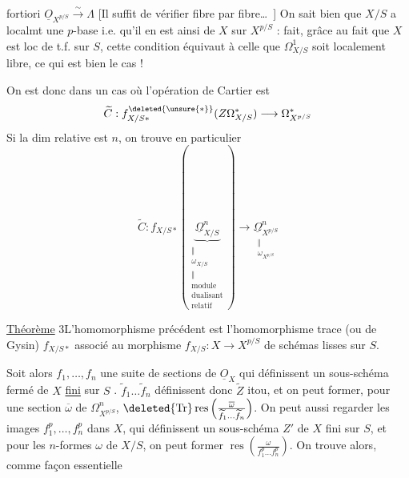 fortiori $\underline O_{X^{p/S}}\xrightarrow{\sim}\Lambda$  [Il suffit de vérifier fibre par fibre\ldots\ ] On sait bien que $X/S$ a localmt une $p$-base i.e. qu'il en est ainsi de $X$ sur $X^{p/S}$ :  fait, grâce au fait que $X$ est loc de t.f. sur $S$, cette condition équivaut à celle que $\Omega^1_{X/S}$ soit localement libre, ce qui est bien le cas !

On est donc dans un cas où l'opération de Cartier est
\[
 \widetilde C:f_{X/S*}^{\deleted{\unsure{*}}}(Z\Omega^*_{X/S})\longrightarrow\Omega^*_{X^{p/S}}
\]
Si la dim relative est $n$, on trouve en particulier
\[
 \widetilde C:f_{X/S*}(\underbrace{\underline\Omega^n_{X/S}}_{
 \substack{\Vert\\\omega_{X/S}\\\Vert\\\text{module}\\\text{dualisant}\\\text{relatif}}})
 \longrightarrow\underset{\substack{\Vert\\\omega_{X^{p/S}}}}{\underline\Omega^n_{X^{p/S}}}
\]

\uline{Théorème} 3\quad L'homomorphisme précédent est l'homomorphisme trace (ou de Gysin) $f_{X/S*}$ associé au morphisme $f_{X/S}:X\longrightarrow X^{p/S}$ de schémas lisses sur $S$.

Soit alors $f_1,\ldots,f_n$ une suite de sections de $\underline O_X$ qui définissent un sous-schéma fermé  de $X$ \uline{fini} sur $S$ . $\widetilde f_1\ldots\widetilde f_n$ définissent donc $\widetilde Z$ itou, et on peut former, pour une section $\overline\omega$ de $\Omega^n_{X^{p/S}}$, $\deleted{\operatorname{Tr}}\operatorname{res}\left(\frac{\overline\omega}{\widetilde f_1\ldots\widetilde f_n}\right)$. On peut aussi regarder les images $f_1^p,\ldots,f_n^p$ dans $X$, qui définissent un sous-schéma $Z'$ de $X$ fini sur $S$, et pour les $n$-formes $\omega$ de $X/S$, on peut former $\operatorname{res}\left(\frac{\omega}{f_1^p\ldots f_n^p}\right)$. On trouve alors, comme façon essentielle

